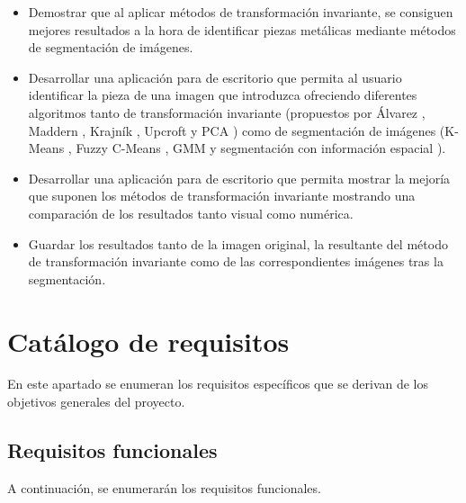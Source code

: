 \begin{itemize}
    \item Demostrar que al aplicar métodos de transformación invariante, se consiguen mejores resultados a la hora de identificar piezas metálicas mediante métodos de segmentación de imágenes.
    \item Desarrollar una aplicación para de escritorio que permita al usuario identificar la pieza de una imagen que introduzca ofreciendo diferentes algoritmos tanto de transformación invariante (propuestos por Álvarez \cite{alvarez2011}, Maddern \cite{maddern2014}, Krajník \cite{krajník2015}, Upcroft \cite{upcroft2014} y PCA \cite{pca2017}) como de segmentación de imágenes (K-Means \cite{MATLAB:2023bKmeans}, Fuzzy C-Means \cite{MATLAB:2023bFuzzy}, GMM \cite{MATLAB:2023bGMM} y segmentación con información espacial \cite{wang2012hmrf}).
    \item Desarrollar una aplicación para de escritorio que permita mostrar la mejoría que suponen los métodos de transformación invariante mostrando una comparación de los resultados tanto visual como numérica.
    \item Guardar los resultados tanto de la imagen original, la resultante del método de transformación invariante como de las correspondientes imágenes tras la segmentación.
\end{itemize}

\section{Catálogo de requisitos}\label{catalogo-de-requisitos}

En este apartado se enumeran los requisitos específicos que se derivan de los objetivos generales del proyecto.

\subsection{Requisitos funcionales}\label{requisitos-funcionales}

A continuación, se enumerarán los requisitos funcionales.

